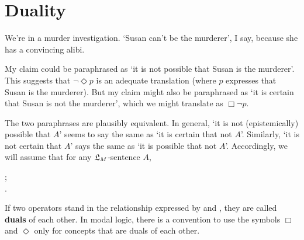 \section{Duality}%
\label{sec:duality}

We're in a murder investigation. `Susan can't be the murderer', I say, because
she has a convincing alibi.

My claim could be paraphrased as `it is not possible that Susan is the
murderer'. This suggests that $\neg\Diamond p$ is an adequate translation (where
$p$ expresses that Susan is the murderer). But my claim might also be
paraphrased as `it is certain that Susan is not the murderer', which we might
translate as $\Box\neg p$. 

The two paraphrases are plausibly equivalent. In general, `it is not
(epistemically) possible that $A$' seems to say the same as `it is certain that
not $A$'. Similarly, `it is not certain that $A$' says the same as `it is
possible that not $A$'. Accordingly, we will assume that for any
$\mathfrak{L}_{M}$-sentence $A$,
%
\begin{principles}
;\\
.
\end{principles}

If two operators stand in the relationship expressed by  and
, they are called \textbf{duals} of each other. In modal logic,
there is a convention to use the symbols $\Box$ and $\Diamond$ only for concepts
that are duals of each other.

